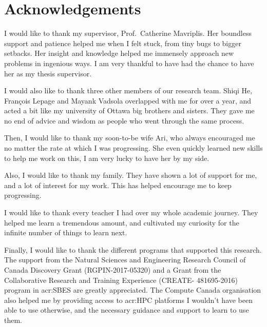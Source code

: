 \chapter*{Acknowledgements}

I would like to thank my supervisor, Prof.\ Catherine Mavriplis. Her boundless support and patience
helped me when I felt stuck, from tiny bugs to bigger setbacks. Her insight and knowledge helped me
immensely approach new problems in ingenious ways. I am very thankful to have had the chance to have
her as my thesis supervisor.

I would also like to thank three other members of our research team. Shiqi He, François Lepage and
Mayank Vadsola overlapped with me for over a year, and acted a bit like my university of Ottawa big
brothers and sisters. They gave me no end of advice and wisdom as people who went through the same
process.

Then, I would like to thank my soon-to-be wife Ari, who always encouraged me no matter the rate at
which I was progressing. She even quickly learned new skills to help me work on this, I am very
lucky to have her by my side.

Also, I would like to thank my family. They have shown a lot of support for me, and a lot of
interest for my work. This has helped encourage me to keep progressing.

I would like to thank every teacher I had over my whole academic journey. They helped me learn a
tremendous amount, and cultivated my curiosity for the infinite number of things to learn next.

Finally, I would like to thank the different programs that supported this research. The support from
the Natural Sciences and Engineering Research Council of Canada Discovery Grant (RGPIN-2017-05320)
and a Grant from the Collaborative Research and Training Experience (CREATE- 481695-2016) program in
\acrfull{acr:SBES} are greatly appreciated. The Compute Canada organisation also helped me by
providing access to \acrshort{acr:HPC} platforms I wouldn't have been able to use otherwise, and the
necessary guidance and support to learn to use them.